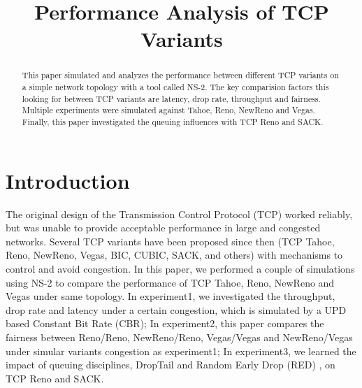 \documentclass[10pt, conference]{lib/IEEEtran}
\begin{document}
\title{Performance Analysis of TCP Variants}

\author{
\and
{}
}
\maketitle


\begin{abstract}
This paper simulated and analyzes the performance between different 
TCP variants on a simple network topology with a tool called NS-2. The 
key comparision factors this looking for between TCP variants are 
latency, drop rate, throughput and fairness. Multiple experiments were 
simulated against Tahoe, Reno, NewReno and Vegas. Finally, this paper 
investigated the queuing influences with TCP Reno and SACK.
\end{abstract}


\section{Introduction}
The original design of the Transmission Control Protocol (TCP) worked 
reliably, but was unable to provide acceptable performance in large 
and congested networks. Several TCP variants have been proposed since 
then (TCP Tahoe, Reno, NewReno, Vegas, BIC, CUBIC, SACK, and others) 
with mechanisms to control and avoid congestion. In this paper, we 
performed a couple of simulations using NS-2 to compare the 
performance of TCP Tahoe, Reno, NewReno and Vegas under same topology. 
In experiment1, we investigated the throughput, drop rate and latency 
under a certain congestion, which is simulated by a UPD based Constant 
Bit Rate (CBR); In experiment2, this paper compares the fairness 
between Reno/Reno, NewReno/Reno, Vegas/Vegas and NewReno/Vegas under 
simular variants congestion as experiment1; In experiment3, we learned 
the impact of queuing disciplines, DropTail and Random Early Drop (RED)
, on TCP Reno and SACK.
\end{document}
